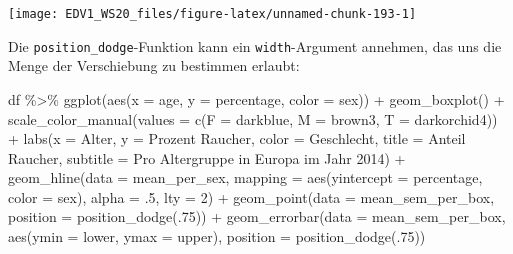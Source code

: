 \documentclass[
]{book}
\newenvironment{Shaded}{\begin{snugshade}}{\end{snugshade}}
\newcommand{\AttributeTok}[1]{\textcolor[rgb]{0.77,0.63,0.00}{#1}}
\newcommand{\DecValTok}[1]{\textcolor[rgb]{0.00,0.00,0.81}{#1}}
\newcommand{\FunctionTok}[1]{\textcolor[rgb]{0.00,0.00,0.00}{#1}}
\newcommand{\NormalTok}[1]{#1}
\newcommand{\SpecialCharTok}[1]{\textcolor[rgb]{0.00,0.00,0.00}{#1}}
\newcommand{\StringTok}[1]{\textcolor[rgb]{0.31,0.60,0.02}{#1}}
\begin{document}
\begin{center}\texttt{[image: EDV1\_WS20\_files/figure-latex/unnamed-chunk-193-1]} \end{center}

Die \texttt{position\_dodge}-Funktion kann ein \texttt{width}-Argument annehmen, das uns die Menge der Verschiebung zu bestimmen erlaubt:

\begin{Shaded}
\begin{Highlighting}[]
\NormalTok{df }\SpecialCharTok{\%\textgreater{}\%} 
  \FunctionTok{ggplot}\NormalTok{(}\FunctionTok{aes}\NormalTok{(}\AttributeTok{x =}\NormalTok{ age,}
             \AttributeTok{y =}\NormalTok{ percentage,}
             \AttributeTok{color =}\NormalTok{ sex)) }\SpecialCharTok{+}
  \FunctionTok{geom\_boxplot}\NormalTok{() }\SpecialCharTok{+}
  \FunctionTok{scale\_color\_manual}\NormalTok{(}\AttributeTok{values =} \FunctionTok{c}\NormalTok{(}\AttributeTok{F =} \StringTok{\textquotesingle{}darkblue\textquotesingle{}}\NormalTok{,}
                               \AttributeTok{M =} \StringTok{\textquotesingle{}brown3\textquotesingle{}}\NormalTok{,}
                               \AttributeTok{T =} \StringTok{\textquotesingle{}darkorchid4\textquotesingle{}}\NormalTok{)) }\SpecialCharTok{+}
  \FunctionTok{labs}\NormalTok{(}\AttributeTok{x =} \StringTok{\textquotesingle{}Alter\textquotesingle{}}\NormalTok{,}
       \AttributeTok{y =} \StringTok{\textquotesingle{}Prozent Raucher\textquotesingle{}}\NormalTok{,}
       \AttributeTok{color =} \StringTok{\textquotesingle{}Geschlecht\textquotesingle{}}\NormalTok{,}
       \AttributeTok{title =} \StringTok{\textquotesingle{}Anteil Raucher\textquotesingle{}}\NormalTok{,}
       \AttributeTok{subtitle =} \StringTok{\textquotesingle{}Pro Altergruppe in Europa im Jahr 2014\textquotesingle{}}\NormalTok{) }\SpecialCharTok{+}
  \FunctionTok{geom\_hline}\NormalTok{(}\AttributeTok{data =}\NormalTok{ mean\_per\_sex,}
             \AttributeTok{mapping =} \FunctionTok{aes}\NormalTok{(}\AttributeTok{yintercept =}\NormalTok{ percentage,}
                           \AttributeTok{color =}\NormalTok{ sex),}
             \AttributeTok{alpha =}\NormalTok{ .}\DecValTok{5}\NormalTok{,}
             \AttributeTok{lty =} \DecValTok{2}\NormalTok{) }\SpecialCharTok{+}
  \FunctionTok{geom\_point}\NormalTok{(}\AttributeTok{data =}\NormalTok{ mean\_sem\_per\_box,}
             \AttributeTok{position =} \FunctionTok{position\_dodge}\NormalTok{(.}\DecValTok{75}\NormalTok{)) }\SpecialCharTok{+}
  \FunctionTok{geom\_errorbar}\NormalTok{(}\AttributeTok{data =}\NormalTok{ mean\_sem\_per\_box,}
                \FunctionTok{aes}\NormalTok{(}\AttributeTok{ymin =}\NormalTok{ lower,}
                    \AttributeTok{ymax =}\NormalTok{ upper),}
             \AttributeTok{position =} \FunctionTok{position\_dodge}\NormalTok{(.}\DecValTok{75}\NormalTok{))}
\end{Highlighting}
\end{Shaded}
\end{document}
